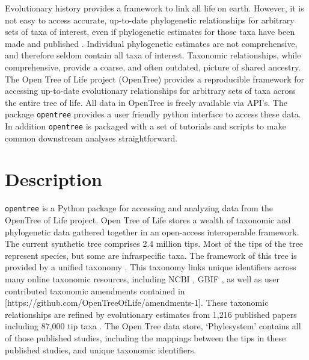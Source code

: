 \documentclass[oupdraft]{sysbio_sse}
\begin{document}
Evolutionary history provides a framework to link all life on earth. However, it is not easy to access accurate, up-to-date phylogenetic relationships for arbitrary sets of taxa of interest, even if phylogenetic estimates for those taxa have been made and published \citep{drew_lost_2013, mctavish_how_2017}. Individual phylogenetic estimates are not comprehensive, and therefore seldom contain all taxa of interest. Taxonomic relationships, while comprehensive, provide a coarse, and often outdated, picture of shared ancestry. 
The Open Tree of Life project (OpenTree) provides a reproducible framework for accessing up-to-date evolutionary relationships for arbitrary sets of taxa across the entire tree of life.
All data in OpenTree is freely available via API's.
The package \texttt{opentree} provides a user friendly python interface to access these data. In addition \texttt{opentree} is packaged with a set of tutorials and scripts to make common downstream analyses straightforward.

\bigskip
\section{Description}
\label{sec2}

\texttt{opentree} is a Python package for accessing and analyzing data from the OpenTree of Life project.
Open Tree of Life stores a wealth of taxonomic and phylogenetic data gathered together in an open-access interoperable framework.
The current synthetic tree \citep{opentreeoflife_open_2019} comprises 2.4 million tips.
Most of the tips of the tree represent species, but some are infraspecific taxa.
The framework of this tree is provided by a unified taxonomy \citep{opentreeoflife_open_2019-1, rees_automated_2017}.
This taxonomy links unique identifiers across many online taxonomic resources, including NCBI \citep{federhen_ncbi_2012}, GBIF \citep{gbif_secretariat_gbif_2019}, as well as user contributed taxonomic amendments contained in [https://github.com/OpenTreeOfLife/amendments-1].
These taxonomic relationships are refined by evolutionary estimates from 1,216 published papers including 87,000 tip taxa \citep{opentreeoflife_open_2019, redelings_supertree_2017}.
The Open Tree data store, `Phylesystem' \citep{mctavish_phylesystem_2015} contains all of those published studies, including the mappings between the tips in these published studies, and unique taxonomic identifiers.
\end{document}
